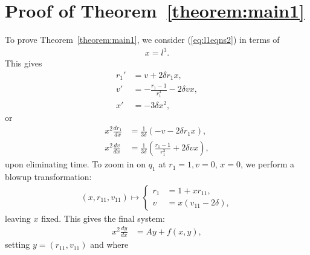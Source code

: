 \documentclass[reqno,12pt]{amsart}
\newcommand{\seclab}[1]{\label{sec:#1}}
\newcommand{\eqlab}[1]{\label{eq:#1}}
\renewcommand{\eqref}[1]{(\ref{eq:#1})}
\newcommand{\thmref}[1]{Theorem~\ref{theorem:#1}}
\numberwithin{equation}{section}
\begin{document}
\section{Proof of \thmref{main1}}\seclab{main1}
To prove \thmref{main1}, we consider \eqref{l1eqns2} 
% 
% 
in terms of 
\begin{align}\eqlab{xeqn}
x=l^3.
\end{align} This gives
\begin{equation}\eqlab{r1vxeqns0}
\begin{aligned}
 r_1' &=v+2\delta r_1 x,\\
 v'  &= -\frac{r_1-1}{r_1^3}-2\delta vx,\\
 x' &=-3 \delta x^2,
\end{aligned}
\end{equation}
or
\begin{equation}\eqlab{r1vxeqns}
\begin{aligned}
 x^2 \frac{dr_1}{dx} &=\frac{1}{3\delta}\left(-v-2\delta r_1 x\right),\\
 x^2 \frac{dv}{dx} &= \frac{1}{3\delta}\left(\frac{r_1-1}{r_1^3}+2\delta vx\right),
\end{aligned}
\end{equation}
upon eliminating time. To zoom in on $q_1$ at $r_1=1,v=0$, $x=0$, we perform a blowup transformation:
\begin{align}
(x,r_{11},v_{11})\mapsto \begin{cases}
 r_1&=1+ xr_{11},\\
 v&=x(v_{11}-2\delta),\end{cases}\eqlab{v11}
\end{align}
leaving $x$ fixed.
This gives the final system:
\begin{align}\eqlab{yeqn}
 x^2 \frac{d y}{dx}
 &= A y+  f(x,y),
\end{align}
setting $y=(r_{11},v_{11})$ and where
\end{document}
